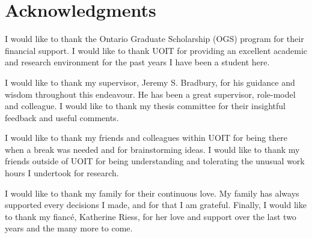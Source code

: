 \chapter*{Acknowledgments}
I would like to thank the Ontario Graduate Scholarship (OGS) program for their financial support. I would like to thank UOIT for providing an excellent academic and research environment for the past years I have been a student here.

I would like to thank my supervisor, Jeremy S. Bradbury, for his guidance and wisdom throughout this endeavour. He has been a great supervisor, role-model and colleague. I would like to thank my thesis committee for their insightful feedback and useful comments.

I would like to thank my friends and colleagues within UOIT for being there when a break was needed and for brainstorming ideas. I would like to thank my friends outside of UOIT for being understanding and tolerating the unusual work hours I undertook for research.

I would like to thank my family for their continuous love. My family has always supported every decisions I made, and for that I am grateful. Finally, I would like to thank my fianc\'{e}, Katherine Riess, for her love and support over the last two years and the many more to come. 